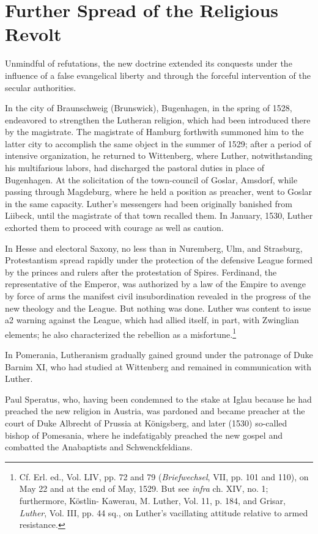 \section{Further Spread of the Religious Revolt}

Unmindful of refutations, the new doctrine extended its conquests
under the influence of a false evangelical liberty and through the
forceful intervention of the secular authorities.

In the city of Braunschweig (Brunswick), Bugenhagen, in the
spring of 1528, endeavored to strengthen the Lutheran religion,
which had been introduced there by the magistrate. The magistrate
of Hamburg forthwith summoned him to the latter city to accomplish the
same object in the summer of 1529; after a period of intensive
organization, he returned to Wittenberg, where Luther, notwithstanding
his multifarious labors, had discharged the pastoral duties
in place of Bugenhagen. At the solicitation of the town-council of
Goslar, Amsdorf, while passing through Magdeburg, where he held
a position as preacher, went to Goslar in the same capacity. Luther’s
messengers had been originally banished from Liibeck, until the magistrate
of that town recalled them. In January, 1530, Luther exhorted
them to proceed with courage as well as caution.

In Hesse and electoral Saxony, no less than in Nuremberg, Ulm,
and Strasburg, Protestantism spread rapidly under the protection of
the defensive League formed by the princes and rulers after the protestation
of Spires. Ferdinand, the representative of the Emperor,
was authorized by a law of the Empire to avenge by force of arms the
manifest civil insubordination revealed in the progress of the new theology
and the League. But nothing was done. Luther was content to
issue a2 warning against the League, which had allied itself, in part,
with Zwinglian elements; he also characterized the rebellion as a
misfortune.\footnote
{Cf. Erl. ed., Vol. LIV, pp. 72 and 79 (\textit{Briefwechsel}, VII, pp. 101 and 110), on May
22 and at the end of May, 1529. But see \textit{infra} ch. XIV, no. 1; furthermore, Köstlin-
Kawerau, M. Luther, Vol. 11, p. 184, and Grisar, \textit{Luther}, Vol. III, pp. 44 sq., on Luther’s
vacillating attitude relative to armed resistance.}

In Pomerania, Lutheranism gradually gained ground under the
patronage of Duke Barnim XI, who had studied at Wittenberg
and remained in communication with Luther.

Paul Speratus, who, having been condemned to the stake at Iglau
because he had preached the new religion in Austria, was pardoned
and became preacher at the court of Duke Albrecht of Prussia at
Königsberg, and later (1530) so-called bishop of Pomesania, where
he indefatigably preached the new gospel and combatted the Anabaptists
and Schwenckfeldians.

